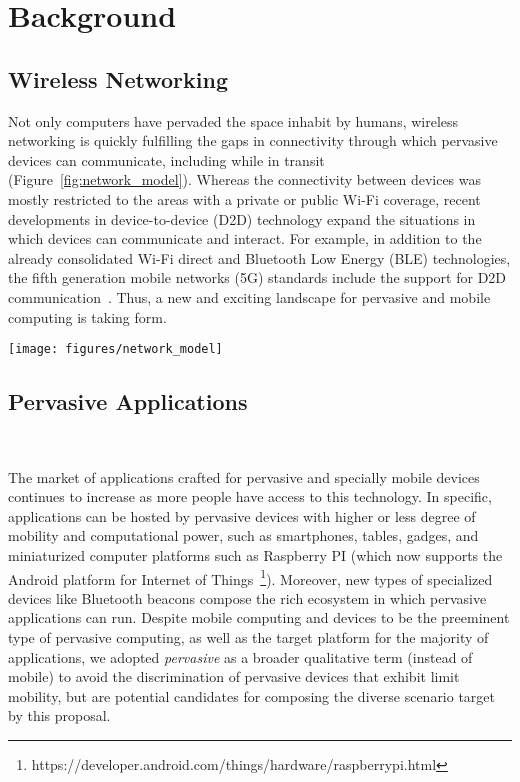 \section{Background}\label{sec:background}


\subsection{Wireless Networking}

Not only computers have pervaded the space inhabit by humans, wireless networking is quickly fulfilling the gaps in connectivity through which pervasive devices can communicate, including while in transit (Figure~\ref{fig:network_model}). Whereas the connectivity between devices was mostly restricted to the areas with a private or public Wi-Fi coverage, recent developments in device-to-device (D2D) technology expand the situations in which devices can communicate and interact. For example, in addition to the already consolidated Wi-Fi direct and Bluetooth Low Energy (BLE) technologies, the fifth generation mobile networks (5G) standards include the support for D2D communication~\cite{Tehrani:2014}. Thus, a new and exciting landscape for pervasive and mobile computing is taking form.

\begin{figure*}[t!]
	\centering
	\texttt{[image: figures/network\_model]}
	\caption{Application nodes communicating through Wi-Fi or D2D technologies}
	\label{fig:network_model}
\end{figure*}

\subsection{Pervasive Applications}~\label{sec:characterization}

The market of applications crafted for pervasive and specially mobile devices continues to increase as more people have access to this technology. In specific, applications can be hosted by pervasive devices with higher or less degree of mobility and computational power, such as smartphones, tables, gadges, and miniaturized computer platforms such as Raspberry PI (which now supports the Android platform for Internet of Things~\footnote{https://developer.android.com/things/hardware/raspberrypi.html}). Moreover, new types of specialized devices like Bluetooth beacons compose the rich ecosystem in which pervasive applications can run. Despite mobile computing and devices to be the preeminent type of pervasive computing, as well as the target platform for the majority of applications, we adopted \textit{pervasive} as a broader qualitative term (instead of mobile) to avoid the discrimination of pervasive devices that exhibit limit mobility, but are potential candidates for composing the diverse scenario target by this proposal. 

